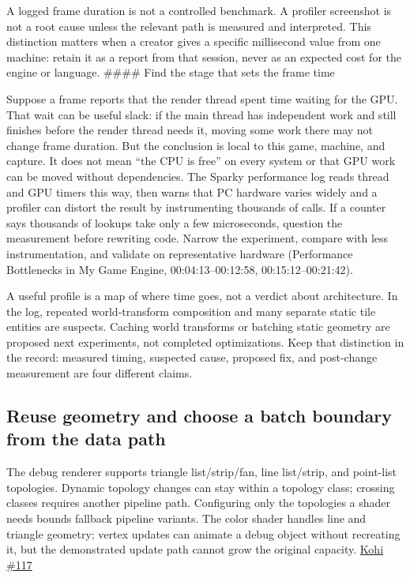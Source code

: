 A logged frame duration is not a controlled benchmark. A profiler screenshot is not a root cause unless the relevant path is measured and interpreted. This distinction matters when a creator gives a specific millisecond value from one machine: retain it as a report from that session, never as an expected cost for the engine or language. \#\#\#\# Find the stage that sets the frame time

Suppose a frame reports that the render thread spent time waiting for the GPU. That wait can be useful slack: if the main thread has independent work and still finishes before the render thread needs it, moving some work there may not change frame duration. But the conclusion is local to this game, machine, and capture. It does not mean ``the CPU is free'' on every system or that GPU work can be moved without dependencies. The Sparky performance log reads thread and GPU timers this way, then warns that PC hardware varies widely and a profiler can distort the result by instrumenting thousands of calls. If a counter says thousands of lookups take only a few microseconds, question the measurement before rewriting code. Narrow the experiment, compare with less instrumentation, and validate on representative hardware (Performance Bottlenecks in My Game Engine, 00:04:13--00:12:58, 00:15:12--00:21:42).

A useful profile is a map of where time goes, not a verdict about architecture. In the log, repeated world-transform composition and many separate static tile entities are suspects. Caching world transforms or batching static geometry are proposed next experiments, not completed optimizations. Keep that distinction in the record: measured timing, suspected cause, proposed fix, and post-change measurement are four different claims.

\subsection{Reuse geometry and choose a batch boundary from the data path}\label{06-engine-ii-ch026-reuse-geometry-and-choose-a-batch-boundary-from-the-data-path}

\hypertarget{06-engine-ii-ch026-reuse-geometry-and-choose-a-batch-boundary-from-the-data-path}{}

The debug renderer supports triangle list/strip/fan, line list/strip, and point-list topologies. Dynamic topology changes can stay within a topology class; crossing classes requires another pipeline path. Configuring only the topologies a shader needs bounds fallback pipeline variants. The color shader handles line and triangle geometry; vertex updates can animate a debug object without recreating it, but the demonstrated update path cannot grow the original capacity. \href{https://www.youtube.com/watch?v=FYpNGvexM0g}{Kohi \#117}

